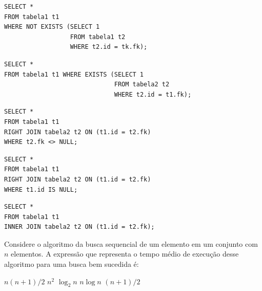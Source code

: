 \documentclass[12pt, addpoints]{exam}
\begin{document}
\begin{questions}
\begin{choices}
\choice \begin{verbatim}SELECT *
FROM tabela1 t1
WHERE NOT EXISTS (SELECT 1
                  FROM tabela1 t2
                  WHERE t2.id = tk.fk);
\end{verbatim}

\choice \begin{verbatim}SELECT *
FROM tabela1 t1 WHERE EXISTS (SELECT 1
                              FROM tabela2 t2
                              WHERE t2.id = t1.fk);
\end{verbatim}

\choice \begin{verbatim}SELECT *
FROM tabela1 t1
RIGHT JOIN tabela2 t2 ON (t1.id = t2.fk)
WHERE t2.fk <> NULL;
\end{verbatim}

\choice \begin{verbatim}SELECT *
FROM tabela1 t1
RIGHT JOIN tabela2 t2 ON (t1.id = t2.fk)
WHERE t1.id IS NULL;
\end{verbatim}

\choice \begin{verbatim}SELECT *
FROM tabela1 t1
INNER JOIN tabela2 t2 ON (t1.id = t2.fk);
\end{verbatim}

\end{choices}

\question
Considere o algoritmo da busca sequencial de um elemento em um conjunto com \( n \) elementos. A expressão que representa o tempo médio de execução desse algoritmo para uma busca bem sucedida é:
\begin{choices}
\choice \( n(n + 1)/2 \)
\choice \( n^2 \)
\choice \( \log_2 n \)
\choice \( n \log n \)
\choice \( (n + 1)/2 \)
\end{choices}


\end{questions}
\end{document}
